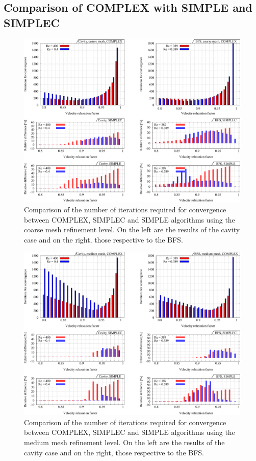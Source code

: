 \documentclass[final,3p,times,11pt,onecolumn]{myElsarticle}
\numberwithin{equation}{section}
\begin{document}
\subsection{Comparison of COMPLEX with SIMPLE and SIMPLEC}
\begin{figure}[b!]
\centering
\includegraphics[width=17cm]{fig/Results/complexCoarse.pdf}
\caption{Comparison of the number of iterations required for convergence between COMPLEX, SIMPLEC and SIMPLE algorithms using the coarse mesh refinement level. On the left are the results of the cavity case and on the right, those respective to the BFS.}
\label{Fig:complexCoarse}
\end{figure}

\begin{figure}[t!]
\centering
\includegraphics[width=17cm]{fig/Results/complexMedium.pdf}
\caption{Comparison of the number of iterations required for convergence between COMPLEX, SIMPLEC and SIMPLE algorithms using the medium mesh refinement level. On the left are the results of the cavity case and on the right, those respective to the BFS.}
\label{Fig:complexMedium}
\end{figure}
\end{document}
